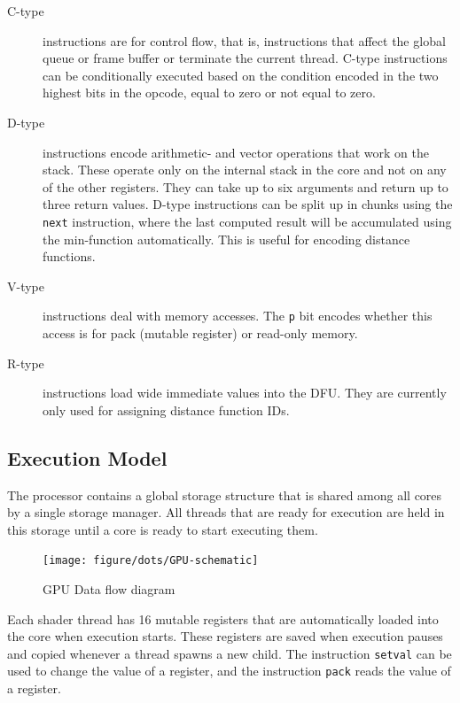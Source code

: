 			\begin{description} 
				\item[C-type] instructions are for control flow, that
						is, instructions that affect the global queue or frame buffer or
						terminate the current thread. C-type instructions can be
						conditionally executed based on the condition encoded in the two
						highest bits in the opcode, equal to zero or not equal to zero. 

				\item[D-type] instructions encode arithmetic- and vector
					operations that work on the stack. These operate only on the
					internal stack in the core and not on any of the other
					registers. They can take up to six arguments and return up
					to three return values. D-type instructions can be split up
					in chunks using the \texttt{next} instruction, where the
					last computed result will be accumulated using the min-function
					automatically. This is useful for encoding distance functions.

				\item[V-type] instructions deal with memory accesses. The
					\texttt{p} bit encodes whether this access is for pack
					(mutable register) or read-only memory.

				\item[R-type] instructions load wide immediate values into the
					DFU. They are currently only used for assigning distance
					function IDs.
			\end{description}

		\subsection{Execution Model}

			The processor contains a global storage structure that is shared
			among all cores by a single storage manager. All threads that are 
			ready for execution are held in this storage until a core is ready 
			to start executing them.

			\begin{figure}[H]
				\centering
				\caption{ GPU Data flow diagram }
					\texttt{[image: figure/dots/GPU-schematic]} 
				\vspace{-4pt}
			\end{figure}
	
			Each shader thread has 16 mutable registers that are automatically
			loaded into the core when execution starts. These registers are
			saved when execution pauses and copied whenever a thread spawns a 
			new child. The instruction \texttt{setval} can be used to change 
			the value of a register, and the instruction \texttt{pack} reads 
			the value of a register.

